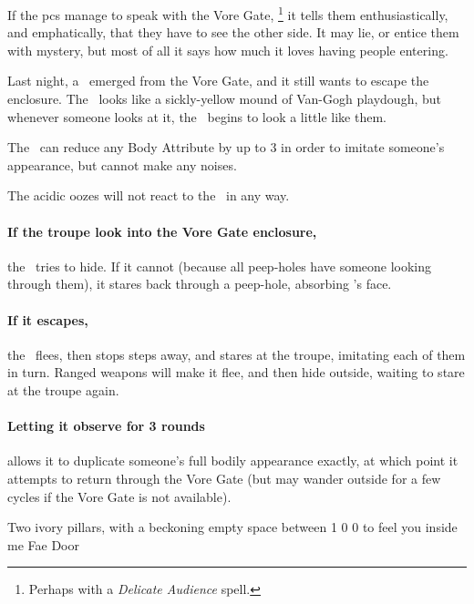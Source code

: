 \begin{multicols}{2}
If the \glspl{pc} manage to speak with the Vore Gate,%
\footnote{Perhaps with a \textit{Delicate Audience} spell.}
it tells them enthusiastically, and emphatically, that they have to see the other side.
It may lie, or entice them with mystery, but most of all it says how much it loves having people entering.

\setcounter{statDots}{0}

\mphlg

Last night, a \superWierdzi\ emerged from the Vore Gate, and it still wants to escape the enclosure.
The \superWierdzi\ looks like a sickly-yellow mound of Van-Gogh playdough, but whenever someone looks at it, the \superWierdzi\ begins to look a little like them.

The \superWierdzi\ can reduce any Body Attribute by up to 3 in order to imitate someone's appearance, but cannot make any noises.

The acidic oozes will not react to the \superWierdzi\ in any way.

\paragraph{If the troupe look into the Vore Gate enclosure,}
the \superWierdzi\ tries to hide.
If it cannot (because all peep-holes have someone looking through them), it stares back through a peep-hole, absorbing 's face.

\paragraph{If it escapes,}
the \superWierdzi\ flees, then stops steps away, and stares at the troupe, imitating each of them in turn.
Ranged weapons will make it flee, and then hide outside, waiting to stare at the troupe again.

\paragraph{Letting it observe for 3 rounds}
allows it to duplicate someone's full bodily appearance exactly, at which point it attempts to return through the Vore Gate (but may wander outside for a few \glspl{cycle} if the Vore Gate is not available).


  {Two ivory pillars, with a beckoning empty space between}%
  {1}%
  {0}%
  {0}%
  {to feel you inside me}%
  {Fae Door}%
  {
    \setcounter{Fire}{3}
    \setcounter{Earth}{2}
    \setcounter{Fate}{1}
    \setcounter{Water}{1}
    \setcounter{Academics}{2}
    \setcounter{Cultivation}{1}
  }%


\end{multicols}
